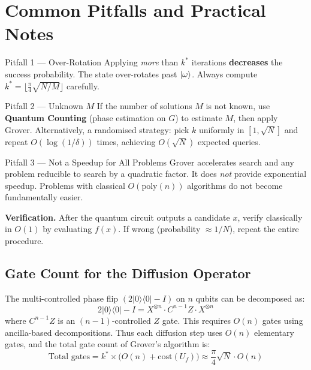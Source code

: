 \documentclass[12pt,a4paper]{article}
\newcommand{\proj}[1]{\vert#1\rangle\langle#1\vert}
\begin{document}
\section{Common Pitfalls and Practical Notes}
\label{sec:pitfalls}

\begin{keybox}{Pitfall 1 — Over-Rotation}
Applying \emph{more} than $k^*$ iterations \textbf{decreases} the success probability. The state over-rotates past $\ket\omega$. Always compute $k^* = \lfloor\frac\pi4\sqrt{N/M}\rfloor$ carefully.
\end{keybox}

\begin{keybox}{Pitfall 2 — Unknown $M$}
If the number of solutions $M$ is not known, use \textbf{Quantum Counting} (phase estimation on $G$) to estimate $M$, then apply Grover. Alternatively, a randomised strategy: pick $k$ uniformly in $[1,\sqrt{N}]$ and repeat $O(\log(1/\delta))$ times, achieving $O(\sqrt{N})$ expected queries.
\end{keybox}

\begin{keybox}{Pitfall 3 — Not a Speedup for All Problems}
Grover accelerates search and any problem reducible to search by a quadratic factor. It does \emph{not} provide exponential speedup. Problems with classical $O(\text{poly}(n))$ algorithms do not become fundamentally easier.
\end{keybox}

\begin{notebox}
\textbf{Verification.} After the quantum circuit outputs a candidate $x$, verify classically in $O(1)$ by evaluating $f(x)$. If wrong (probability $\approx 1/N$), repeat the entire procedure.
\end{notebox}

\subsection{Gate Count for the Diffusion Operator}

The multi-controlled phase flip $(2\proj{0}-I)$ on $n$ qubits can be decomposed as:
\[
  2\proj{0}-I = X^{\otimes n}\cdot C^{n-1}Z \cdot X^{\otimes n}
\]
where $C^{n-1}Z$ is an $(n-1)$-controlled $Z$ gate. This requires $O(n)$ gates using ancilla-based decompositions. Thus each diffusion step uses $O(n)$ elementary gates, and the total gate count of Grover's algorithm is:
\[
  \text{Total gates} = k^*\times\bigl(O(n) + \text{cost}(U_f)\bigr) \approx \frac\pi4\sqrt{N}\cdot O(n)
\]
\end{document}
